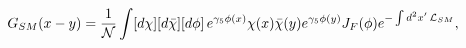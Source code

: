 \begin{equation}
G_{SM}(x-y)=\frac{1}{\cal N}\int [d\chi][d\bar{\chi}][d\phi]\,
e^{\gamma_5\phi(x)}\chi(x) \bar{\chi}(y)e^{\gamma_5\phi(y)} J_F(\phi) e^{ -\int d^2x'\, {\cal L}_{SM}},
\label{corrSMd}
\end{equation}

